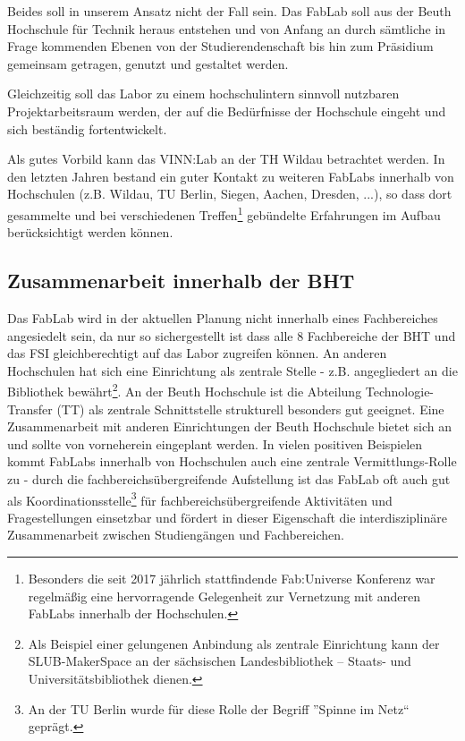 \documentclass[parskip=half,headsepline,footsepline,titlepage]{scrartcl}
\begin{document}
Beides soll in unserem Ansatz nicht der Fall sein. Das FabLab soll aus der Beuth Hochschule für Technik heraus entstehen und von Anfang an durch sämtliche in Frage kommenden Ebenen von der Studierendenschaft bis hin zum Präsidium gemeinsam getragen, genutzt und gestaltet werden.

Gleichzeitig soll das Labor zu einem hochschulintern sinnvoll nutzbaren Projektarbeitsraum werden, der auf die Bedürfnisse der Hochschule eingeht und sich beständig fortentwickelt.

Als gutes Vorbild kann das VINN:Lab an der TH Wildau betrachtet werden. In den letzten Jahren bestand ein guter Kontakt zu weiteren FabLabs innerhalb von Hochschulen (z.B. Wildau, TU Berlin, Siegen, Aachen, Dresden, ...), so dass dort gesammelte und bei verschiedenen Treffen\footnote{Besonders die seit 2017 jährlich stattfindende Fab:Universe Konferenz war regelmäßig eine hervorragende Gelegenheit zur Vernetzung mit anderen FabLabs innerhalb der Hochschulen.} gebündelte Erfahrungen im Aufbau berücksichtigt werden können.


\subsection{Zusammenarbeit innerhalb der BHT}

Das FabLab wird in der aktuellen Planung nicht innerhalb eines Fachbereiches angesiedelt sein, da nur so sichergestellt ist dass alle 8 Fachbereiche der BHT und das FSI gleichberechtigt auf das Labor zugreifen können. An anderen Hochschulen hat sich eine Einrichtung als zentrale Stelle - z.B. angegliedert an die Bibliothek bewährt\footnote{Als Beispiel einer gelungenen Anbindung als zentrale Einrichtung kann der SLUB-MakerSpace an der sächsischen Landesbibliothek – Staats- und Universitätsbibliothek dienen.}. An der Beuth Hochschule ist die Abteilung Technologie-Transfer (TT) als zentrale Schnittstelle strukturell besonders gut geeignet. Eine Zusammenarbeit mit anderen Einrichtungen der Beuth Hochschule bietet sich an und sollte von vorneherein eingeplant werden.
In vielen positiven Beispielen kommt FabLabs innerhalb von Hochschulen auch eine zentrale Vermittlungs-Rolle zu - durch die fachbereichsübergreifende Aufstellung ist das FabLab oft auch gut als Koordinationsstelle\footnote{An der TU Berlin wurde für diese Rolle der Begriff ''Spinne im Netz`` geprägt.} für fachbereichsübergreifende Aktivitäten und Fragestellungen einsetzbar und fördert in dieser Eigenschaft die interdisziplinäre Zusammenarbeit zwischen Studiengängen und Fachbereichen.
\end{document}
